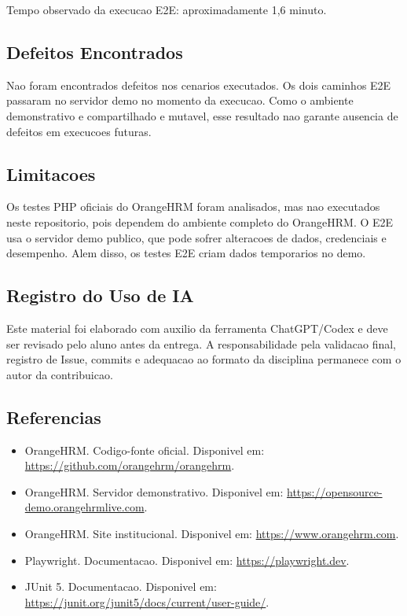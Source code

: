 Tempo observado da execucao E2E: aproximadamente 1,6 minuto.

\subsection{Defeitos Encontrados}
Nao foram encontrados defeitos nos cenarios executados. Os dois caminhos E2E passaram no servidor demo no momento da execucao. Como o ambiente demonstrativo e compartilhado e mutavel, esse resultado nao garante ausencia de defeitos em execucoes futuras.

\subsection{Limitacoes}
Os testes PHP oficiais do OrangeHRM foram analisados, mas nao executados neste repositorio, pois dependem do ambiente completo do OrangeHRM. O E2E usa o servidor demo publico, que pode sofrer alteracoes de dados, credenciais e desempenho. Alem disso, os testes E2E criam dados temporarios no demo.

\subsection{Registro do Uso de IA}
Este material foi elaborado com auxilio da ferramenta ChatGPT/Codex e deve ser revisado pelo aluno antes da entrega. A responsabilidade pela validacao final, registro de Issue, commits e adequacao ao formato da disciplina permanece com o autor da contribuicao.

\subsection{Referencias}
\begin{itemize}
    \item OrangeHRM. Codigo-fonte oficial. Disponivel em: \url{https://github.com/orangehrm/orangehrm}.
    \item OrangeHRM. Servidor demonstrativo. Disponivel em: \url{https://opensource-demo.orangehrmlive.com}.
    \item OrangeHRM. Site institucional. Disponivel em: \url{https://www.orangehrm.com}.
    \item Playwright. Documentacao. Disponivel em: \url{https://playwright.dev}.
    \item JUnit 5. Documentacao. Disponivel em: \url{https://junit.org/junit5/docs/current/user-guide/}.
\end{itemize}
